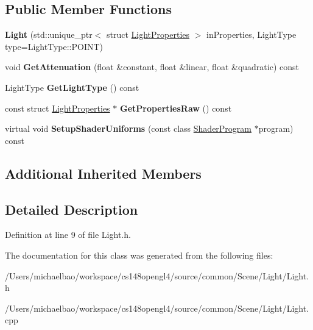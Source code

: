 \subsection*{Public Member Functions}
\begin{DoxyCompactItemize}
\item 
\hypertarget{class_light_adca12f0d5470bc3f2e6e77233ab3dcf1}{}{\bfseries Light} (std\+::unique\+\_\+ptr$<$ struct \hyperlink{struct_light_properties}{Light\+Properties} $>$ in\+Properties, Light\+Type type=Light\+Type\+::\+P\+O\+I\+N\+T)\label{class_light_adca12f0d5470bc3f2e6e77233ab3dcf1}

\item 
\hypertarget{class_light_a2d3f34b821c0cb0b5baa664ee91d309f}{}void {\bfseries Get\+Attenuation} (float \&constant, float \&linear, float \&quadratic) const \label{class_light_a2d3f34b821c0cb0b5baa664ee91d309f}

\item 
\hypertarget{class_light_a393ede80ccba5f4314135011a665afab}{}Light\+Type {\bfseries Get\+Light\+Type} () const \label{class_light_a393ede80ccba5f4314135011a665afab}

\item 
\hypertarget{class_light_a074230bc62c5bf705bc39c1de64474c0}{}const struct \hyperlink{struct_light_properties}{Light\+Properties} $\ast$ {\bfseries Get\+Properties\+Raw} () const \label{class_light_a074230bc62c5bf705bc39c1de64474c0}

\item 
\hypertarget{class_light_a360ea479af434502737f6b5c0b0ff3d9}{}virtual void {\bfseries Setup\+Shader\+Uniforms} (const class \hyperlink{class_shader_program}{Shader\+Program} $\ast$program) const \label{class_light_a360ea479af434502737f6b5c0b0ff3d9}

\end{DoxyCompactItemize}
\subsection*{Additional Inherited Members}


\subsection{Detailed Description}


Definition at line 9 of file Light.\+h.



The documentation for this class was generated from the following files\+:\begin{DoxyCompactItemize}
\item 
/\+Users/michaelbao/workspace/cs148opengl4/source/common/\+Scene/\+Light/Light.\+h\item 
/\+Users/michaelbao/workspace/cs148opengl4/source/common/\+Scene/\+Light/Light.\+cpp\end{DoxyCompactItemize}
